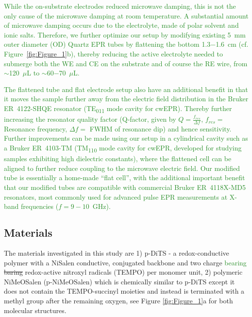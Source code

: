 \documentclass{WileyMSP-template}
\newcommand{\np}[1]{\textcolor{ForestGreen}{#1}}
\newcommand{\ik}[1]{\textcolor{RawSienna}{#1}}
\begin{document}
\bigbreak

\np{
While the on-substrate electrodes reduced microwave damping, this is not the only cause of the microwave damping at room temperature. A substantial amount of microwave damping occurs due to the electrolyte, made of polar solvent and ionic salts. Therefore, we further optimize our setup by modifying existing 5~mm outer diameter (OD) Quartz EPR tubes by flattening the bottom 1.3$-$1.6~cm (cf. Figure~\ref{fig:Figure_1}b), thereby reducing the active electrolyte needed to submerge both the WE and CE on the substrate and of course the RE wire, from $\sim$120~$\mu$L to $\sim$60$-$70~$\mu$L. 
}

\bigbreak

\np{
The flattened tube and flat electrode setup also have an additional benefit in that it moves the sample further away from the electric field distribution in the Bruker ER~4122-SHQE resonator (TE\textsubscript{011} mode cavity for cwEPR). Thereby further increasing the resonator quality factor (Q-factor, given by $Q = \frac{f_{res}}{\Delta f}$, $f_{res} =$ Resonance frequency, $\Delta f =$ FWHM of resonance dip) and hence sensitivity. Further improvements can be made using our setup in a cylindrical cavity such as a Bruker ER~4103-TM (TM\textsubscript{110} mode cavity for cwEPR, developed for studying samples exhibiting high dielectric constants), where the flattened cell can be aligned to further reduce coupling to the microwave electric field. Our modified tube is essentially a home-made ``flat cell'', with the additional important benefit that our modified tubes are compatible with commercial Bruker ER~4118X-MD5 resonators, most commonly used for advanced pulse EPR measurements at X-band frequencies ($f = 9-10$~GHz).
}

\bigbreak

\subsection*{Materials}

\ik{The materials investigated in this study are 1) p-DiTS - a redox-conductive polymer with a NiSalen conductive, conjugated backbone and two charge \np{bearing} \sout{baring} redox-active nitroxyl radicals (TEMPO) per monomer unit, 2) polymeric NiMeOSalen (p-NiMeOSalen) which is chemically similar to p-DiTS except it does not contain the TEMPO-succinyl moieties and instead is terminated with a methyl group after the remaining oxygen, see Figure \ref{fig:Figure_1}a for both molecular structures.}
\end{document}
